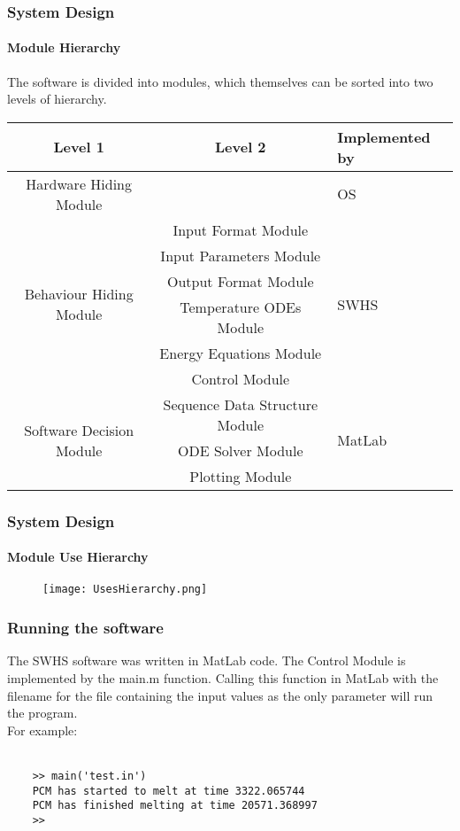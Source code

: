 \documentclass{beamer}
\begin{document}
\begin{frame}
	\frametitle{System Design}
	\framesubtitle{Module Hierarchy}
	The software is divided into modules, which themselves can be sorted into two levels of hierarchy.
		
	\begin{tabular}{ | c | c | p{} |}
	\hline
	\textbf{Level 1} & \textbf{Level 2} & \textbf{Implemented by}\\
	\hline
	\multirow{2}{0.25\textwidth}{Hardware Hiding Module} & & \multirow{2}{0.2\textwidth}{OS}\\
	& & \\
	\hline
	\multirow{6}{0.25\textwidth}{Behaviour Hiding Module} & Input Format Module & \multirow{6}{0.2\textwidth}{SWHS}\\
	& Input Parameters Module & \\
	& Output Format Module & \\
	& Temperature ODEs Module & \\
	& Energy Equations Module & \\
	& Control Module & \\
	\hline
	\multirow{3}{0.25\textwidth}{Software Decision Module} & Sequence Data Structure Module & \multirow{3}{0.2\textwidth}{MatLab}\\
	& ODE Solver Module & \\
	& Plotting Module & \\
	\hline
	\end{tabular}
\end{frame}
	
\begin{frame}
	\frametitle{System Design}
	\framesubtitle{Module Use Hierarchy}
	\begin{figure}
	\texttt{[image: UsesHierarchy.png]}
	\end{figure}
\end{frame}
	
\begin{frame}[fragile]
	\frametitle{Running the software}
	The SWHS software was written in MatLab code. The Control Module is implemented by the main.m function. Calling this function in MatLab with the filename for the file containing the input values as the only parameter will run the program.\\
	For example:\\
	~\newline
	\begin{verbatim}
	>> main('test.in')
	PCM has started to melt at time 3322.065744
	PCM has finished melting at time 20571.368997
	>>
	\end{verbatim}
\end{frame}
	
\end{document}
